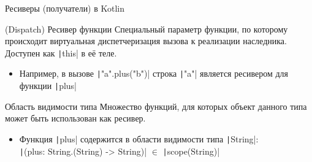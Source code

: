 \documentclass[usenames, dvipsnames]{beamer}
\begin{document}
    \begin{frame}[fragile]{Ресиверы (получатели) в Kotlin}
        \begin{block}{(Dispatch) Ресивер функции}
            Специальный параметр функции, по которому происходит виртуальная диспетчеризация вызова к реализации наследника.
            Доступен как \texttt|this| в её теле.
            \begin{itemize}
                \item Например, в вызове \texttt|"a".plus("b")| строка \texttt|"a"| является ресивером для функции \texttt|plus|
            \end{itemize}
        \end{block}

        \begin{block}{Область видимости типа}
            Множество функций, для которых объект данного типа может быть использован как ресивер.
            \begin{itemize}
                \item Функция \texttt|plus| содержится в области видимости типа \texttt|String|: \\
                \texttt|(plus: String.(String) -> String)| $\in$ \texttt|scope(String)|
            \end{itemize}
        \end{block}
    \end{frame}
\end{document}
